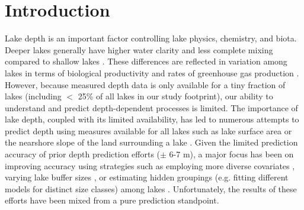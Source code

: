 \documentclass[draft]{agujournal2019}
\begin{document}

%
%
%
%


\section{Introduction}
\noindent
\noindent
Lake depth is an important factor controlling lake physics, chemistry, and biota. Deeper lakes generally have higher water clarity and less complete mixing compared to shallow lakes \cite{feeEffectsLakeSize1996, readSimulating2368Temperate2014}. These differences are reflected in variation among lakes in terms of biological productivity \cite{qinWaterDepthUnderpins2020} and rates of greenhouse gas production \cite{liSignificantContributionLake2020}. However, because measured depth data is only available for a tiny fraction of lakes (including $<$ 25\% of all lakes in our study footprint), our ability to understand and predict depth-dependent processes is limited. The importance of lake depth, coupled with its limited availability, has led to numerous attempts to predict depth using measures available for all lakes such as lake surface area or the nearshore slope of the land surrounding a lake \cite{heathcotePredictingBathymetricFeatures2015, oliver2016prediction, sobekPredictingDepthVolume2011}. Given the limited prediction accuracy of prior depth prediction efforts ($\pm$ 6-7 m), a major focus has been on improving accuracy using strategies such as employing more diverse covariates \cite{oliver2016prediction}, varying lake buffer sizes \cite{heathcotePredictingBathymetricFeatures2015}, or estimating hidden groupings (e.g. fitting different models for distinct size classes) among lakes \cite{caelVolumeMeanDepth2017, sobekPredictingDepthVolume2011}. Unfortunately, the results of these efforts have been mixed from a pure prediction standpoint.
\end{document}
